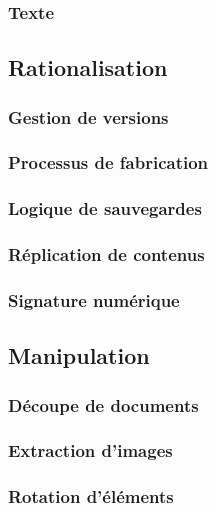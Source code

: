 \subsubsection{Texte}

\subsection{Rationalisation}

\subsubsection{Gestion de versions}

\subsubsection{Processus de fabrication}

\subsubsection{Logique de sauvegardes}

\subsubsection{Réplication de contenus}

\subsubsection{Signature numérique}

\pagebreak
\subsection{Manipulation}

\subsubsection{Découpe de documents}

\subsubsection{Extraction d’images}

\subsubsection{Rotation d’éléments}

